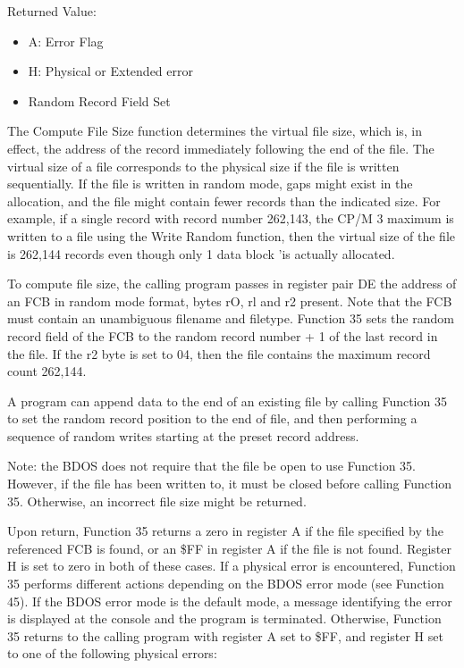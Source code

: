 Returned Value:
\begin{itemize}
\item[] A: Error Flag
\item[] H: Physical or Extended error
\item[] Random Record Field Set
\end{itemize}

The Compute File Size function determines the virtual file size, which
is, in effect, the address of the record immediately following the end
of the file. The virtual size of a file corresponds to the physical
size if the file is written sequentially. If the file is written in
random mode, gaps might exist in the allocation, and the file might
contain fewer records than the indicated size. For example, if a
single record with record number 262,143, the CP/M 3 maximum is
written to a file using the Write Random function, then the virtual
size of the file is 262,144 records even though only 1 data block 'is
actually allocated.

To compute file size, the calling program passes in register pair DE
the address of an FCB in random mode format, bytes rO, rl and r2
present. Note that the FCB must contain an unambiguous filename and
filetype. Function 35 sets the random record field of the FCB to the
random record number + 1 of the last record in the file. If the r2
byte is set to 04, then the file contains the maximum record count
262,144.

A program can append data to the end of an existing file by calling
Function 35 to set the random record position to the end of file, and
then performing a sequence of random writes starting at the preset
record address.

Note: the BDOS does not require that the file be open to use Function
35. However, if the file has been written to, it must be closed before
calling Function 35. Otherwise, an incorrect file size might be
returned.

Upon return, Function 35 returns a zero in register A if the file
specified by the referenced FCB is found, or an \$FF in register A if
the file is not found. Register H is set to zero in both of these
cases. If a physical error is encountered, Function 35 performs
different actions depending on the BDOS error mode (see Function 45).
If the BDOS error mode is the default mode, a message identifying the
error is displayed at the console and the program is
terminated. Otherwise, Function 35 returns to the calling program with
register A set to \$FF, and register H set to one of the following
physical errors:

